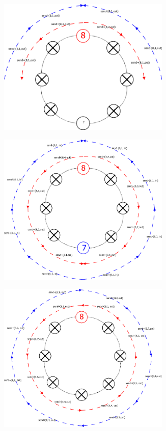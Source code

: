 \begin{minipage}{\linewidth}
	\centering\includegraphics[width=310px]{gfx/HS_p2.png}
	\label{img:hs_p2}
\end{minipage}

\begin{minipage}{\linewidth}
    \centering\includegraphics[width=310px]{gfx/HS_p3.png}
    \label{img:hs_p3}
\end{minipage}

\begin{minipage}{\linewidth}
	\centering\includegraphics[width=310px]{gfx/HS_p4.png}
	\label{img:hs_p4}
\end{minipage}

